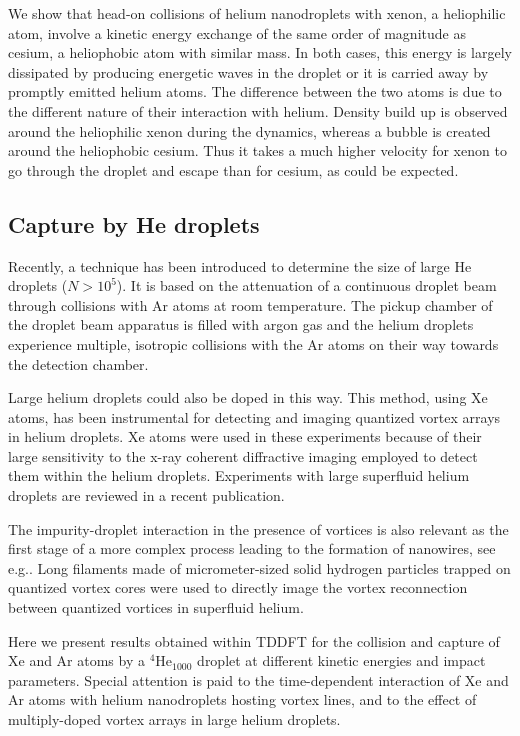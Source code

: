 		We show that head-on collisions of helium nanodroplets with xenon, a heliophilic atom, involve a kinetic energy exchange of the same order of magnitude as cesium, a heliophobic atom with similar mass. In both cases, this energy is largely dissipated by producing energetic waves in the droplet or it is carried away by promptly emitted helium atoms. The difference between the two atoms is due to the different nature of their interaction with helium. Density build up is observed around the heliophilic xenon during the dynamics, whereas a bubble is created around the heliophobic cesium. Thus it takes a much higher velocity for xenon to go through the droplet and escape than for cesium, as could be expected.
	
	\subsection*{Capture by He droplets}
		Recently, a technique has been introduced to determine the size of large He droplets ($N> 10^5$). It is based on the attenuation of a continuous droplet beam through collisions with Ar atoms at room temperature\citep{Gom11}. The pickup chamber of the droplet beam apparatus is filled with argon gas and the helium droplets experience multiple, isotropic collisions with the Ar atoms on their way towards the detection chamber. 

		Large helium droplets could also be doped in this way. This method, using Xe atoms, has been instrumental for detecting and imaging quantized vortex arrays in helium droplets\citep{Gom14,Jones2016}. Xe atoms were used in these experiments because of their large sensitivity to the x-ray coherent diffractive imaging employed to detect them within the helium droplets. Experiments with large superfluid helium droplets are reviewed in a recent publication\citep{Tan17}.

		The impurity-droplet interaction in the presence of vortices is also relevant as the first stage of a more complex process leading to the formation of nanowires, see e.g.. Long filaments made of micrometer-sized solid hydrogen particles trapped on quantized vortex cores were used to directly image the vortex reconnection between quantized vortices in superfluid helium\citep{Bewley2008}.
		
		Here we present results obtained within TDDFT for the collision and capture of Xe and Ar atoms by a $^4$He$_{1000}$ droplet at different kinetic energies and impact parameters. Special attention is paid to the  time-dependent interaction of Xe and Ar atoms with helium nanodroplets hosting vortex lines, and to the effect of multiply-doped vortex arrays in large helium droplets.

